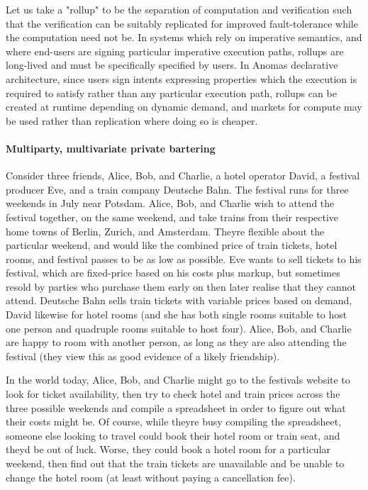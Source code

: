 Let us take a "rollup" to be the separation of computation and
verification such that the verification can be suitably replicated for
improved fault-tolerance while the computation need not be. In systems
which rely on imperative semantics, and where end-users are signing
particular imperative execution paths, rollups are long-lived and must
be specifically specified by users. In Anoma\textquotesingle s
declarative architecture, since users sign intents expressing properties
which the execution is required to satisfy rather than any particular
execution path, rollups can be created at runtime depending on dynamic
demand, and markets for compute may be used rather than replication
where doing so is cheaper.

\paragraph{Multiparty, multivariate private
bartering}\label{multiparty-multivariate-private-bartering}

Consider three friends, Alice, Bob, and Charlie, a hotel operator David,
a festival producer Eve, and a train company Deutsche Bahn. The festival
runs for three weekends in July near Potsdam. Alice, Bob, and Charlie
wish to attend the festival together, on the same weekend, and take
trains from their respective home towns of Berlin, Zurich, and
Amsterdam. They\textquotesingle re flexible about the particular
weekend, and would like the combined price of train tickets, hotel
rooms, and festival passes to be as low as possible. Eve wants to sell
tickets to his festival, which are fixed-price based on his costs plus
markup, but sometimes resold by parties who purchase them early on then
later realise that they cannot attend. Deutsche Bahn sells train tickets
with variable prices based on demand, David likewise for hotel rooms
(and she has both single rooms suitable to host one person and quadruple
rooms suitable to host four). Alice, Bob, and Charlie are happy to room
with another person, as long as they are also attending the festival
(they view this as good evidence of a likely friendship).

In the world today, Alice, Bob, and Charlie might go to the
festival\textquotesingle s website to look for ticket availability, then
try to check hotel and train prices across the three possible weekends
and compile a spreadsheet in order to figure out what their costs might
be. Of course, while they\textquotesingle re busy compiling the
spreadsheet, someone else looking to travel could book their hotel room
or train seat, and they\textquotesingle d be out of luck. Worse, they
could book a hotel room for a particular weekend, then find out that the
train tickets are unavailable and be unable to change the hotel room (at
least without paying a cancellation fee).

